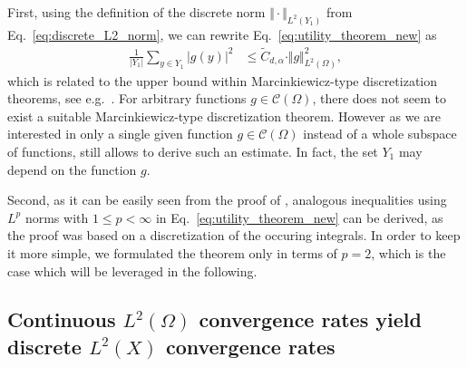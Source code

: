 \documentclass[a4paper, 10pt]{article}
\begin{document}
First, using the definition of the discrete norm $\Vert \cdot \Vert_{L^2(Y_1)}$ from Eq.~\eqref{eq:discrete_L2_norm},
we can rewrite Eq.~\eqref{eq:utility_theorem_new} as
\begin{align*}
\frac{1}{|Y_1|} \sum_{y \in Y_1} |g(y)|^2 &\leq  \tilde{C}_{d,\alpha} \cdot \Vert g \Vert_{L^2(\Omega)}^2,
%
\end{align*}
which is related to the upper bound within Marcinkiewicz-type discretization theorems, 
see e.g.\ \cite[Eq.\ (1.1)]{temlyakov2018marcinkiewicz}.
%
For arbitrary functions $g \in \mathcal{C}(\Omega)$, there does not seem to exist a suitable Marcinkiewicz-type discretization theorem.
However as we are interested in only a single given function $g \in \mathcal{C}(\Omega)$ instead of a whole subspace of functions,
 still allows to derive such an estimate.
In fact, the set $Y_1$ may depend on the function $g$.

Second, as it can be easily seen from the proof of , 
analogous inequalities using $L^p$ norms with $1 \leq p < \infty$ in Eq.~\eqref{eq:utility_theorem_new} can be derived, 
as the proof was based on a discretization of the occuring integrals.
In order to keep it more simple, we formulated the theorem only in terms of $p=2$, which is the case which will be leveraged in the following.



%
%
%


%

%
%
%
%
%
%
%
%
%
%
%
%
%
%
%
%
%
%
%
%
%
%
%
%
%
%
%
%
%
%
%
%
%
%
%
%
%
%
%
%
%
%
%
%
%
%
%
%
%
%
%
%
%
%
%
%
%
%
%
%
%
%
%
%
%
%
%
%
%
%
%
%
%
%
%
%
%
%
%
%
%
%
%
%
%
%
%
%
%
%
%
%
%
%
%
%
%
%
%
%
%
%
%
%
%
%
%
%
%
%
%
%
%
%
%
%
%
%
%
%
%
%
%
%
%
%
%
%
%
%
%
%
%
%
%
%
%
%
%
%
%
%
%
%
%
%
%
%
%
%
%
%
%
%
%
%
%
%
%
%
%
%
%
%
%
%
%
%
%
%
%
%
%
%
%
%
%
%
%
%
%
%
%
%
%
%
%
%
%
%
%
%
%
%
%
%
%
%
%
%
%
%
%
%


%
%
%

%
%
%
%
%
%
%
%
%
%
%
%
%
%
%
%
%
%
%
%
%
%
%
%
%
%
%
%
%
%
%
%
%
%
%
%
%
%
%
%
%
%
%
%
%
%
%
%
%
%
%
%
%
%
%
%
%
%
%
%
%
%
%
%
%
%
%
%
%
%
%
%
%
%
%
%
%
%
%
%
%
%
%
%
%
%
%
%
%
%
%
%
%
%
%
%
%
%
%
%
%
%
%
%
%
%
%
%
%
%
%
%
%
%
%
%
%
%
%
%
%
%
%
%
%
%

%
%
%
%

\subsection{Continuous $L^2(\Omega)$ convergence rates yield discrete $L^2(X)$ convergence rates}
\end{document}
